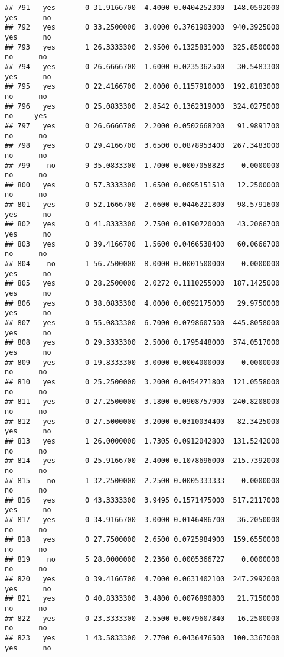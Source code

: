 \documentclass[]{article}
\begin{document}
\begin{verbatim}
## 791   yes       0 31.9166700  4.4000 0.0404252300  148.0592000   yes      no
## 792   yes       0 33.2500000  3.0000 0.3761903000  940.3925000   yes      no
## 793   yes       1 26.3333300  2.9500 0.1325831000  325.8500000    no      no
## 794   yes       0 26.6666700  1.6000 0.0235362500   30.5483300   yes      no
## 795   yes       0 22.4166700  2.0000 0.1157910000  192.8183000    no      no
## 796   yes       0 25.0833300  2.8542 0.1362319000  324.0275000    no     yes
## 797   yes       0 26.6666700  2.2000 0.0502668200   91.9891700    no      no
## 798   yes       0 29.4166700  3.6500 0.0878953400  267.3483000    no      no
## 799    no       9 35.0833300  1.7000 0.0007058823    0.0000000    no      no
## 800   yes       0 57.3333300  1.6500 0.0095151510   12.2500000    no      no
## 801   yes       0 52.1666700  2.6600 0.0446221800   98.5791600   yes      no
## 802   yes       0 41.8333300  2.7500 0.0190720000   43.2066700   yes      no
## 803   yes       0 39.4166700  1.5600 0.0466538400   60.0666700    no      no
## 804    no       1 56.7500000  8.0000 0.0001500000    0.0000000   yes      no
## 805   yes       0 28.2500000  2.0272 0.1110255000  187.1425000   yes      no
## 806   yes       0 38.0833300  4.0000 0.0092175000   29.9750000   yes      no
## 807   yes       0 55.0833300  6.7000 0.0798607500  445.8058000   yes      no
## 808   yes       0 29.3333300  2.5000 0.1795448000  374.0517000   yes      no
## 809   yes       0 19.8333300  3.0000 0.0004000000    0.0000000    no      no
## 810   yes       0 25.2500000  3.2000 0.0454271800  121.0558000    no      no
## 811   yes       0 27.2500000  3.1800 0.0908757900  240.8208000    no      no
## 812   yes       0 27.5000000  3.2000 0.0310034400   82.3425000   yes      no
## 813   yes       1 26.0000000  1.7305 0.0912042800  131.5242000    no      no
## 814   yes       0 25.9166700  2.4000 0.1078696000  215.7392000    no      no
## 815    no       1 32.2500000  2.2500 0.0005333333    0.0000000    no      no
## 816   yes       0 43.3333300  3.9495 0.1571475000  517.2117000   yes      no
## 817   yes       0 34.9166700  3.0000 0.0146486700   36.2050000    no      no
## 818   yes       0 27.7500000  2.6500 0.0725984900  159.6550000    no      no
## 819    no       5 28.0000000  2.2360 0.0005366727    0.0000000    no      no
## 820   yes       0 39.4166700  4.7000 0.0631402100  247.2992000   yes      no
## 821   yes       0 40.8333300  3.4800 0.0076890800   21.7150000    no      no
## 822   yes       0 23.3333300  2.5500 0.0079607840   16.2500000    no      no
## 823   yes       1 43.5833300  2.7700 0.0436476500  100.3367000   yes      no

\end{verbatim}
\end{document}
